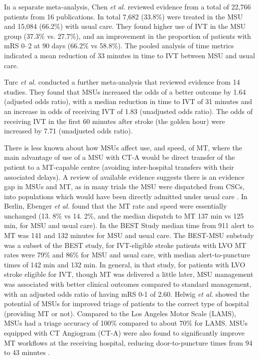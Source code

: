In a separate meta-analysis, Chen \textit{et al.} \cite{chen_systematic_2022} reviewed evidence from a total of 22,766 patients from 16 publications. In total 7,682 (33.8\%) were treated in the MSU and 15,084 (66.2\%) with usual care. They found higher use of IVT in the MSU group (37.3\% vs. 27.7\%), and an improvement in the proportion of patients with mRS 0--2 at 90 days (66.2\% vs 58.8\%).  The pooled analysis of time metrics indicated a mean reduction of 33 minutes in time to IVT between MSU and usual care.

Turc \textit{et al.} \cite{turc_comparison_2022} conducted a further meta-analysis that reviewed evidence from 14 studies. They found that MSUs increased the odds of a better outcome by 1.64 (adjusted odds ratio), with a median reduction in time to IVT of 31 minutes and an increase in odds of receiving IVT of 1.83 (unadjusted odds ratio). The odds of receiving IVT in the first 60 minutes after stroke (the golden hour) were increased by 7.71 (unadjusted odds ratio).

There is less known about how MSUs affect use, and speed, of MT, where the main advantage of use of a MSU with CT-A would be direct transfer of the patient to a MT-capable centre (avoiding inter-hospital transfers with their associated delays). A review of available evidence suggests there is an evidence gap in MSUs and MT, as in many trials the MSU were dispatched from CSCs, into populations which would have been directly admitted under usual care \cite{navi_mobile_2022}. In Berlin, Ebenger \textit{et al.} \cite{ebinger_association_2021} found that the MT rate and speed were essentially unchanged (13. 8\% vs 14. 2\%, and the median dispatch to MT 137 min vs 125 min, for MSU and usual care). In the BEST Study \cite{grotta_prospective_2021} median time from 911 alert to MT was 141 and 132 minutes for MSU and usual care. The BEST-MSU substudy \cite{czap_impact_2024} was a subset of the BEST study, for IVT-eligible stroke patients with LVO MT rates were 79\% and 86\% for MSU and usual care,  with median alert-to-puncture times of 142 min and 132 min. In general, in that study, for patients with LVO stroke eligible for IVT, though MT was delivered a little later, MSU management was associated with better clinical outcomes compared to standard management, with an adjusted odds ratio of having mRS 0-1 of 2.60. Helwig \textit{et al.} \cite{helwig_prehospital_2019} showed the potential of MSUs for improved triage of patients to the correct type of hospital (providing MT or not). Compared to the Los Angeles Motor Scale (LAMS), MSUs had a triage accuracy of 100\% compared to about 70\% for LAMS. MSUs equipped with CT Angiogram (CT-A) were also found to significantly improve MT workflows at the receiving hospital, reducing door-to-puncture times from 94 to 43 minutes \cite{czap_mobile_2020}.

